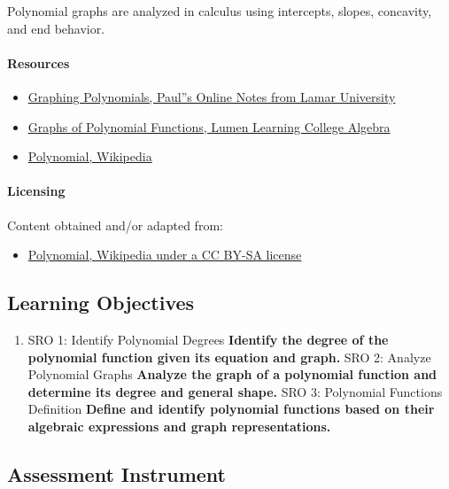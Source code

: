 Polynomial graphs are analyzed in calculus using intercepts, slopes, concavity, and end behavior.

\paragraph{Resources}

\begin{itemize}
    \item \href{https://tutorial.math.lamar.edu/classes/alg/graphingpolynomials.aspx}{Graphing Polynomials, Paul''s Online Notes from Lamar University}
    \item \href{https://courses.lumenlearning.com/collegealgebra2017/chapter/graphs-of-polynomial-functions/}{Graphs of Polynomial Functions, Lumen Learning College Algebra}
    \item \href{https://en.wikipedia.org/wiki/Polynomial}{Polynomial, Wikipedia}
\end{itemize}

\paragraph{Licensing}

Content obtained and/or adapted from:

\begin{itemize}
    \item \href{https://en.wikipedia.org/wiki/Polynomial}{Polynomial, Wikipedia under a CC BY-SA license}
\end{itemize}

\subsection{Learning Objectives}

\begin{enumerate}
    \item SRO 1: Identify Polynomial Degrees \textbf{Identify the degree of the polynomial function given its equation and graph.} SRO 2: Analyze Polynomial Graphs \textbf{Analyze the graph of a polynomial function and determine its degree and general shape.} SRO 3: Polynomial Functions Definition \textbf{Define and identify polynomial functions based on their algebraic expressions and graph representations.}
\end{enumerate}

\subsection{Assessment Instrument}

